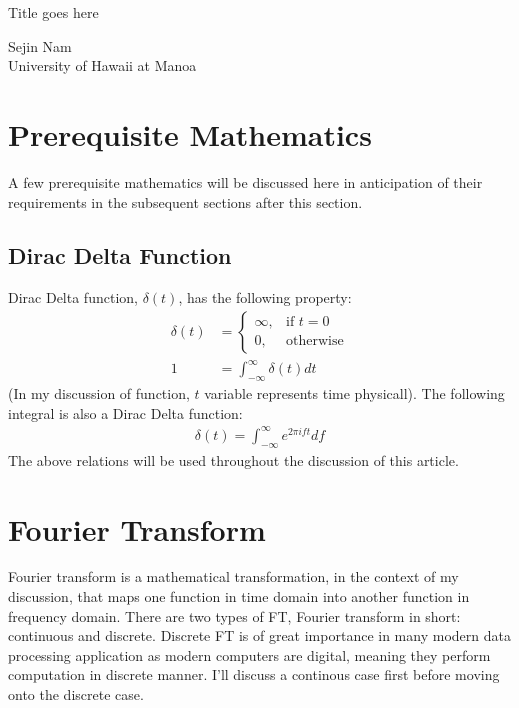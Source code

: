 \documentclass[letterpaper, 11pt]{article}
\newcommand{\fint}{\int_{-\infty}^{\infty}}
\numberwithin{equation}{section}
\begin{document}
\begin{titlepage}
	\begin{center}
		\Huge Title goes here \vfill 
	\end{center}

	\begin{flushright}
		Sejin Nam\\
		University of Hawaii at Manoa
	\end{flushright}
\end{titlepage}

\tableofcontents
\clearpage

\section{Prerequisite Mathematics}
A few prerequisite mathematics will be discussed here in anticipation of their requirements in the subsequent sections after this section. 

\subsection{Dirac Delta Function}
Dirac Delta function, \(\delta (t)\), has the following property:
\begin{align}
	\delta (t)	&=\begin{cases}
		\infty, & \text{if } t = 0 \\
		0,	& \text{otherwise}
	\end{cases}\\
		1	&= \fint \delta (t) dt
\end{align}
(In my discussion of function, \(t\) variable represents time physicall). The following integral is also a Dirac Delta function:
\begin{align}
	\delta (t) = \fint e^{2\pi ift} df\label{eq:1}
\end{align}
The above relations will be used throughout the discussion of this article.

\section{Fourier Transform}
Fourier transform is a mathematical transformation, in the context of my discussion, that maps one function in time domain into another function in frequency domain. There are two types of FT, Fourier transform in short: continuous and discrete. Discrete FT is of great importance in many modern data processing application as modern computers are digital, meaning they perform computation in discrete manner. I'll discuss a continous case first before moving onto the discrete case.
\end{document}
